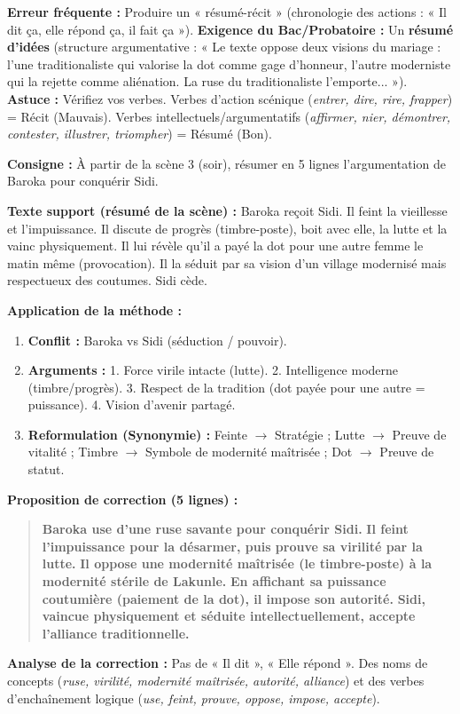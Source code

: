 \documentclass[11pt]{article}
\begin{document}
\begin{attention}
\textbf{Erreur fréquente :} Produire un « résumé-récit » (chronologie des actions : « Il dit ça, elle répond ça, il fait ça »).
\textbf{Exigence du Bac/Probatoire :} Un \textbf{résumé d'idées} (structure argumentative : « Le texte oppose deux visions du mariage : l'une traditionaliste qui valorise la dot comme gage d'honneur, l'autre moderniste qui la rejette comme aliénation. La ruse du traditionaliste l'emporte... »).
\textbf{Astuce :} Vérifiez vos verbes. Verbes d'action scénique (\emph{entrer, dire, rire, frapper}) = Récit (Mauvais). Verbes intellectuels/argumentatifs (\emph{affirmer, nier, démontrer, contester, illustrer, triompher}) = Résumé (Bon).
\end{attention}

\begin{exoresolu}
\textbf{Consigne :} À partir de la scène 3 (soir), résumer en 5 lignes l'argumentation de Baroka pour conquérir Sidi.

\textbf{Texte support (résumé de la scène) :} Baroka reçoit Sidi. Il feint la vieillesse et l'impuissance. Il discute de progrès (timbre-poste), boit avec elle, la lutte et la vainc physiquement. Il lui révèle qu'il a payé la dot pour une autre femme le matin même (provocation). Il la séduit par sa vision d'un village modernisé mais respectueux des coutumes. Sidi cède.

\textbf{Application de la méthode :}
\begin{enumerate}
    \item \textbf{Conflit :} Baroka vs Sidi (séduction / pouvoir).
    \item \textbf{Arguments :} 1. Force virile intacte (lutte). 2. Intelligence moderne (timbre/progrès). 3. Respect de la tradition (dot payée pour une autre = puissance). 4. Vision d'avenir partagé.
    \item \textbf{Reformulation (Synonymie) :} Feinte $\rightarrow$ Stratégie ; Lutte $\rightarrow$ Preuve de vitalité ; Timbre $\rightarrow$ Symbole de modernité maîtrisée ; Dot $\rightarrow$ Preuve de statut.
\end{enumerate}

\tcblower

\textbf{Proposition de correction (5 lignes) :}
\begin{quote}
\textbf{Baroka use d'une ruse savante pour conquérir Sidi.} \textbf{Il feint l'impuissance pour la désarmer, puis prouve sa virilité par la lutte.} \textbf{Il oppose une modernité maîtrisée (le timbre-poste) à la modernité stérile de Lakunle.} \textbf{En affichant sa puissance coutumière (paiement de la dot), il impose son autorité.} \textbf{Sidi, vaincue physiquement et séduite intellectuellement, accepte l'alliance traditionnelle.}
\end{quote}

\textbf{Analyse de la correction :} Pas de « Il dit », « Elle répond ». Des noms de concepts (\emph{ruse, virilité, modernité maîtrisée, autorité, alliance}) et des verbes d'enchaînement logique (\emph{use, feint, prouve, oppose, impose, accepte}).
\end{exoresolu}
\end{document}
